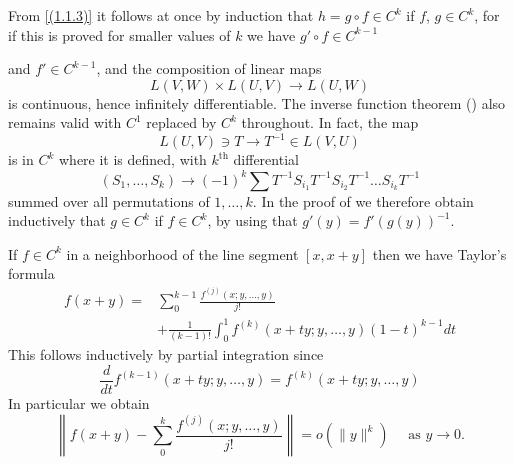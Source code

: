 From \eqref{(1.1.3)} it follows at once by induction that $h=g \circ f \in C^{k}$ if $f$, $g \in C^{k}$, for if this is proved for smaller values of $k$ we have $g' \circ f \in C^{k-1}$

and $f' \in C^{k-1}$, and the composition of linear maps
\[
	L(V, W) \times L(U, V) \rightarrow L(U, W)
\]
is continuous, hence infinitely differentiable. The inverse function theorem () also remains valid with $C^{1}$ replaced by $C^{k}$ throughout. In fact, the map
\[
	L(U, V) \ni T \rightarrow T^{-1} \in L(V, U)
\]
is in $C^{k}$ where it is defined, with $k^{\text {th}}$ differential
\[
	\left(S_{1}, \ldots, S_{k}\right) \rightarrow(-1)^{k} \sum T^{-1} S_{i_{1}} T^{-1} S_{i_{2}} T^{-1} \ldots S_{i_{k}} T^{-1}
\]
summed over all permutations of $1, \ldots, k$. In the proof of  we therefore obtain inductively that $g \in C^{k}$ if $f \in C^{k}$, by using that $g'(y)=f'(g(y))^{-1}$.

If $f \in C^{k}$ in a neighborhood of the line segment $[x, x+y]$ then we have Taylor's formula
\begin{align}
    \label{(1.1.7)}
	f(x+y)= & \sum_{0}^{k-1} \frac{f^{(j)}(x ; y, \ldots, y)}{j !}     \\
	        & + \frac{1}{(k-1) !}\int_{0}^{1} f^{(k)}(x+t y ; y, \ldots, y)(1-t)^{k-1} d t
\end{align}
This follows inductively by partial integration since
\[
	\frac{d}{d t} f^{(k-1)}(x+t y ; y, \ldots, y)=f^{(k)}(x+t y ; y, \ldots, y)
\]
In particular we obtain
\begin{equation}
    \label{(1.1.8)}
	\left\|f(x+y)-\sum_{0}^{k} \frac{f^{(j)}(x ; y, \ldots, y)}{j!}\right\|=o\left(\|y\|^{k}\right) \quad \text { as } y \rightarrow 0 .
\end{equation}

